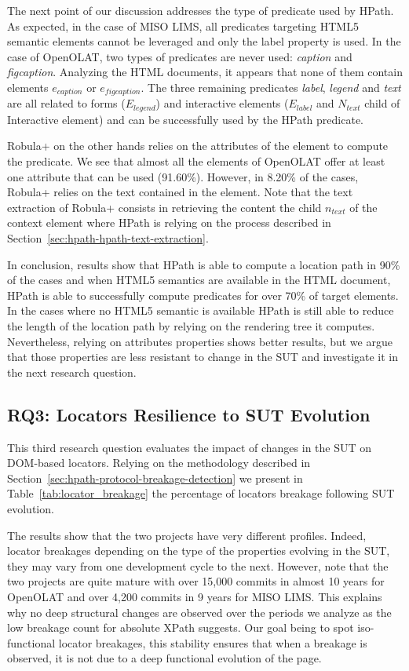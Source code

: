 The next point of our discussion addresses the type of predicate used by HPath. As expected, in the case of MISO LIMS, all predicates targeting HTML5 semantic elements cannot be leveraged and only the label property is used. In the case of OpenOLAT, two types of predicates are never used: \emph{caption} and \emph{figcaption}. Analyzing the HTML documents, it appears that none of them contain elements $e_{caption}$ or $e_{figcaption}$. The three remaining predicates \emph{label}, \emph{legend} and \emph{text} are all related to forms ($E_{legend}$) and interactive elements ($E_{label}$ and $N_{text}$ child of Interactive element) and can be successfully used by the HPath predicate.

Robula+ on the other hands relies on the attributes of the element to compute the predicate. We see that almost all the elements of OpenOLAT offer at least one attribute that can be used (91.60\%). However, in 8.20\% of the cases, Robula+ relies on the text contained in the element. Note that the text extraction of Robula+ consists in retrieving the content the child $n_{text}$ of the context element where HPath is relying on the process described in Section~\ref{sec:hpath-hpath-text-extraction}.

In conclusion, results show that HPath is able to compute a location path in 90\% of the cases and when HTML5 semantics are available in the HTML document, HPath is able to successfully compute predicates for over 70\% of target elements. In the cases where no HTML5 semantic is available HPath is still able to reduce the length of the location path by relying on the rendering tree it computes. Nevertheless, relying on attributes properties shows better results, but we argue that those properties are less resistant to change in the SUT and investigate it in the next research question.

\subsection{RQ3: Locators Resilience to SUT Evolution}
\label{sec:locator_evolution_analysis_results}

This third research question evaluates the impact of changes in the SUT on DOM-based locators. Relying on the methodology described in Section~\ref{sec:hpath-protocol-breakage-detection} we present in Table~\ref{tab:locator_breakage} the percentage of locators breakage following SUT evolution. 

The results show that the two projects have very different profiles. Indeed, locator breakages depending on the type of the properties evolving in the SUT, they may vary from one development cycle to the next. However, note that the two projects are quite mature with over 15,000 commits in almost 10 years for OpenOLAT and over 4,200 commits in 9 years for MISO LIMS. This explains why no deep structural changes are observed over the periods we analyze as the low breakage count for absolute XPath suggests. Our goal being to spot iso-functional locator breakages, this stability ensures that when a breakage is observed, it is not due to a deep functional evolution of the page.

